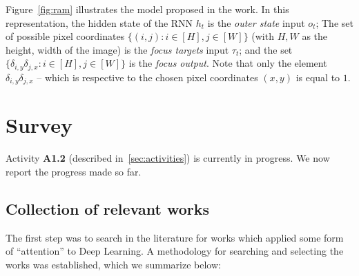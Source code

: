 \documentclass[12pt]{article}
\begin{document}
Figure~\ref{fig:ram} illustrates the model proposed in the work.
In this representation, the hidden state of the RNN $h_t$ is the \emph{outer state} input $o_t$;
The set of possible pixel coordinates $\{(i, j): i \in [H], j \in [W]\}$ (with $H, W$ as the height, width of the image)
is the \emph{focus targets} input $\tau_t$;
and the set $\{\delta_{i, y}\delta_{j, x}: i \in [H], j \in [W]\}$ is the \emph{focus output}.
Note that only the element $\delta_{i, y}\delta_{j,x}$ -- which is respective to the chosen pixel coordinates $(x, y)$
is equal to $1$.

\section{Survey}
Activity \textbf{A1.2} (described in~\ref{sec:activities}) is currently in progress.
We now report the progress made so far.

\subsection{Collection of relevant works}
The first step was to search in the literature for works which applied some form
of ``attention'' to Deep Learning.
A methodology for searching and selecting the works was established,
which we summarize below:
\end{document}
